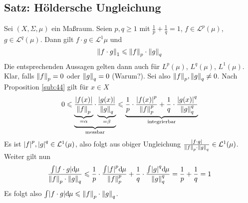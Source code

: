 \subsection{Satz: Höldersche Ungleichung} %
\label{sub:45}
Sei $(X,\Sigma,\mu)$ ein Maßraum. Seien $p,q \ge 1$ mit $\frac{1}{p} +\frac{1}{q}=1 $, $f \in \mathcal{L}^p(\mu)$, $g \in \mathcal{L}^q(\mu)$. Dann gilt 
$f \cdot g \in \mathcal{L}^1{\mu}$ und
\[
	\norm[1]{f \cdot g} \le \norm[p]{f} \cdot \norm[q]{g}   
\]
Die entsprechenden Aussagen gelten dann auch für $L^p(\mu)$, $L^q(\mu)$, $L^1(\mu)$.
Klar, falls $\norm[p]{f} =0 $ oder $\norm[q]{g} =0$ (Warum?). Sei also $\norm[p]{f}, \norm[q]{g} \not= 0$. Nach Proposition \ref{sub:44} gilt für $x \in X$
\[
	0 \le \underbrace{\underbrace{\frac{\abs*{f(x)} }{\norm[p]{f}}}_{=\alpha} \cdot \underbrace{\frac{\abs*{g(x)} }{\norm[q]{g} }}_{=\beta} }_{\text{messbar}}
	\le \underbrace{\frac{1}{p} \cdot \frac{\abs*{f(x)}^p }{\norm[p]{f}^p } + \frac{1}{q} \cdot \frac{\abs*{g(x)}^q }{\norm[q]{g}^q }}_{\text{integrierbar}}
\]
Es ist $\abs*{f}^p , \abs*{g}^q  \in \mathcal{L}^1(\mu)$, also folgt aus obiger Ungleichung 
$\frac{\abs*{ f \cdot g }}{\norm[p]{f} \cdot \norm[q]{g}}  \in \mathcal{L}^1(\mu)$. Weiter gilt nun
\begin{align*}
	\frac{\int \abs*{f \cdot g} \mathd \mu}{\norm[p]{f} \cdot \norm[q]{g}} \le \frac{1}{p} \cdot \frac{\int \abs*{f}^p \mathd \mu }{\norm[p]{f}^p } +
	\frac{1}{q} \cdot \frac{\int \abs*{g}^q \mathd \mu }{\norm[q]{g}^q} = \frac{1}{p} + \frac{1}{q} = 1       
\end{align*}
Es folgt also $\int \abs*{f \cdot g} \mathd \mu  \le \norm[p]{f}  \cdot \norm[q]{g}$. \bewende

